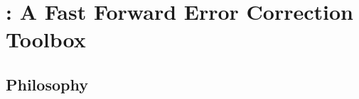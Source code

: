 
\section[\AFFECT]{\AFFECT: A Fast Forward Error Correction Toolbox}

\subsection[Philosophy]{Philosophy}


